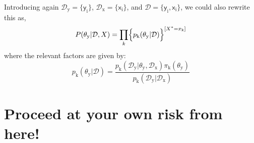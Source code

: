 \documentclass[]{report}
\begin{document}
Introducing again $\mathcal{D}_\mathrm{y} = \{ \mathsf{y}_\mathrm{i} \} $, $\mathcal{D}_\mathrm{x} = \{ \mathsf{x}_\mathrm{i} \} $, and $\mathcal{D} = \{ \mathsf{y}_\mathrm{i}, \mathsf{x}_\mathrm{i} \} $, we could also rewrite this as,
\begin{equation}
P( \theta_\mathrm{y} | \mathcal{D}, X ) 
=
\prod_{k}
	\Bigl\{
		p_\mathrm{k}( \theta_\mathrm{y} | \mathcal{D} )
	\Bigr\}^{
		[ X^* = x_\mathrm{k} ]
	}
\end{equation}
where the relevant factors are given by:
\begin{equation}
p_\mathrm{k}( \theta_\mathrm{y} | \mathcal{D} ) 
=
\frac
	{
		p_\mathrm{k}( \mathcal{D}_\mathrm{y} |
			\theta_\mathrm{y}, \mathcal{D}_\mathrm{x}
		)
		\pi_\mathrm{k}( \theta_\mathrm{y} )
	}
	{
		p_\mathrm{k}( \mathcal{D}_\mathrm{y} | \mathcal{D}_\mathrm{x} )
	}
\end{equation}

\section*{Proceed at your own risk from here!}
\end{document}
